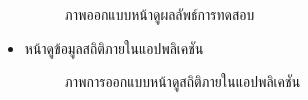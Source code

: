 \documentclass[12pt,oneside,openright,a4paper]{cpe-thai-project}
\begin{document}
\begin{itemize}
\begin{figure}[!ht]
      \caption{ภาพออกแบบหน้าดูผลลัพธ์การทดสอบ}\label{fig:system}
    \end{figure}
  \newpage
  \item หน้าดูข้อมูลสถิติภายในแอปพลิเคชัน
    \begin{figure}[!ht]\centering
      \setlength{\fboxrule}{0.2mm} %
      \setlength{\fboxsep}{1cm}
      \caption{ภาพการออกแบบหน้าดูสถิติภายในแอปพลิเคชัน}\label{fig:system}
        
  \end{figure}
\end{itemize}
\newpage
\end{document}
